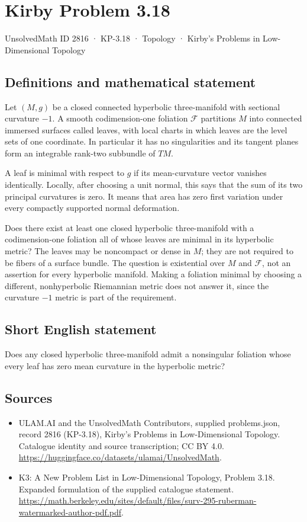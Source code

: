 \documentclass[11pt,a4paper]{article}
\begin{document}
\section*{Kirby Problem 3.18}\label{2816}
{\small UnsolvedMath ID 2816 · KP-3.18 · Topology · Kirby's Problems in Low-Dimensional Topology}
\subsection{Definitions and mathematical statement}
Let $(M,g)$ be a closed connected hyperbolic three-manifold with sectional
curvature $-1$. A smooth codimension-one foliation $\mathcal F$ partitions
$M$ into connected immersed surfaces called leaves, with local charts in
which leaves are the level sets of one coordinate. In particular it has no
singularities and its tangent planes form an integrable rank-two subbundle
of $TM$.

A leaf is minimal with respect to $g$ if its mean-curvature vector vanishes
identically. Locally, after choosing a unit normal, this says that the sum
of its two principal curvatures is zero. It means that area has zero first
variation under every compactly supported normal deformation.

Does there exist at least one closed hyperbolic three-manifold with a
codimension-one foliation all of whose leaves are minimal in its hyperbolic
metric? The leaves may be noncompact or dense in $M$; they are not required
to be fibers of a surface bundle. The question is existential over $M$ and
$\mathcal F$, not an assertion for every hyperbolic manifold. Making a
foliation minimal by choosing a different, nonhyperbolic Riemannian metric
does not answer it, since the curvature $-1$ metric is part of the requirement.
\subsection{Short English statement}
Does any closed hyperbolic three-manifold admit a nonsingular foliation whose every leaf has zero mean curvature in the hyperbolic metric?
\subsection{Sources}
\begin{itemize}
\item[S1] ULAM.AI and the UnsolvedMath Contributors, supplied problems.json, record 2816 (KP-3.18), Kirby's Problems in Low-Dimensional Topology. Catalogue identity and source transcription; CC BY 4.0.
\url{https://huggingface.co/datasets/ulamai/UnsolvedMath}.
\item[S2] K3: A New Problem List in Low-Dimensional Topology, Problem 3.18. Expanded formulation of the supplied catalogue statement.
\url{https://math.berkeley.edu/sites/default/files/surv-295-ruberman-watermarked-author-pdf.pdf}.
\end{itemize}
\end{document}

